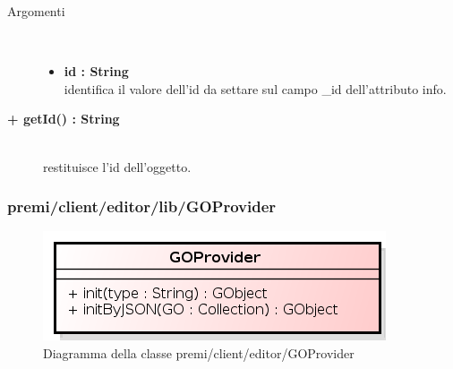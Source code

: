 \begin{description}
\begin{description}
		\begin{description}
			\item[Argomenti] \hfill \\
				\begin{itemize}
				
					\item \textbf{id : String			} \hfill \\
					identifica il valore dell'id da settare sul campo \_id dell'attributo info.
				\end{itemize}
		\end{description}
		
\end{description}

\begin{description}
		\item[\textbf{\color{blue}+ getId() : String			}] \hfill \\
			restituisce l'id dell'oggetto.
\end{description}


\end{description}

\subsubsection{premi/client/editor/lib/GOProvider}
\begin{figure}[h]
\begin{center}
\includegraphics[scale=0.40]{img/diacla/GOProvider.png}
\caption{Diagramma della classe premi/client/editor/GOProvider}
\end{center}
\end{figure}

